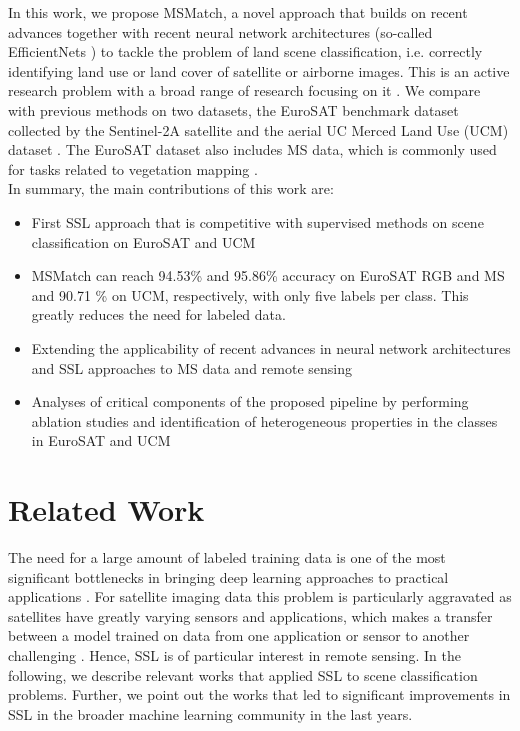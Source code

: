 \documentclass[journal]{IEEEtran}
\begin{document}
In this work, we propose MSMatch, a novel approach that builds on recent advances \cite{kurakin2020} together with recent neural network architectures (so-called EfficientNets \cite{tan2019}) to tackle the problem of land scene classification, i.e. correctly identifying land use or land cover of satellite or airborne images. This is an active research problem with a broad range of research focusing on it \cite{cheng2017,cheng2020,gu2019}.
We compare with previous methods on two datasets, the EuroSAT benchmark dataset \cite{helber2018,helber2019} collected by the Sentinel-2A satellite and the aerial UC Merced Land Use (UCM) dataset \cite{yang2010}. The EuroSAT dataset also includes MS data, which is commonly used for tasks related to vegetation mapping \cite{chen2016}. \\
In summary, the main contributions of this work are:

\begin{itemize}
\item First SSL approach that is competitive with supervised methods on scene classification on EuroSAT and UCM

\item MSMatch can reach 94.53\% and 95.86\% accuracy on EuroSAT RGB and MS and 90.71 \% on UCM, respectively, with only five labels per class. This greatly reduces the need for labeled data.
 
\item Extending the applicability of recent advances in neural network architectures and SSL approaches to MS data and remote sensing
  
\item Analyses of critical components of the proposed pipeline by performing ablation studies and identification of heterogeneous properties in the classes in EuroSAT and UCM

\end{itemize}

\section{Related Work}
The need for a large amount of labeled training data is one of the most significant bottlenecks in bringing deep learning approaches to practical applications \cite{ma2019}. For satellite imaging data this problem is particularly aggravated as satellites have greatly varying sensors and applications, which makes a transfer between a model trained on data from one application or sensor to another challenging \cite{furano2020towards}. Hence, SSL is of particular interest in remote sensing. In the following, we describe relevant works that applied SSL to scene classification problems. Further, we point out the works that led to significant improvements in SSL in the broader machine learning community in the last years. 
\end{document}
